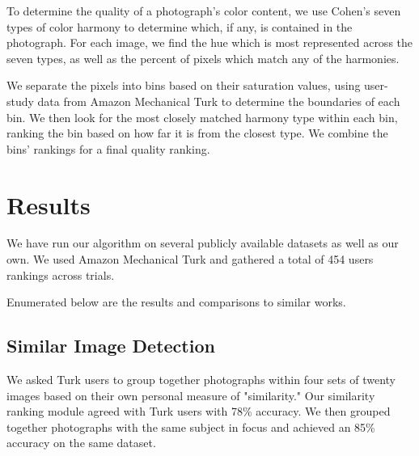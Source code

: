 \documentclass{article}
\begin{document}
To determine the quality of a photograph's color content, we use Cohen's seven types of color harmony\cite{Cohen-Or:2006:CH:1179352.1141933} to determine which, if any, is contained in the photograph. For each image, we find the hue which is most represented across the seven types, as well as the percent of pixels which match any of the harmonies.

We separate the pixels into bins based on their saturation values, using user-study data from Amazon Mechanical Turk to determine the boundaries of each bin. We then look for the most closely matched harmony type within each bin, ranking the bin based on how far it is from the closest type. We combine the bins' rankings for a final quality ranking.



\section{Results}
We have run our algorithm on several publicly available datasets as well as our own. We used Amazon Mechanical Turk and gathered a total of 454 users rankings across trials.

Enumerated below are the results and comparisons to similar works.

\subsection{Similar Image Detection}
We asked Turk users to group together photographs within four sets of twenty images based on their own personal measure of "similarity." Our similarity ranking module agreed with Turk users with 78\% accuracy. We then grouped together photographs with the same subject in focus and achieved an 85\% accuracy on the same dataset. %
\end{document}
